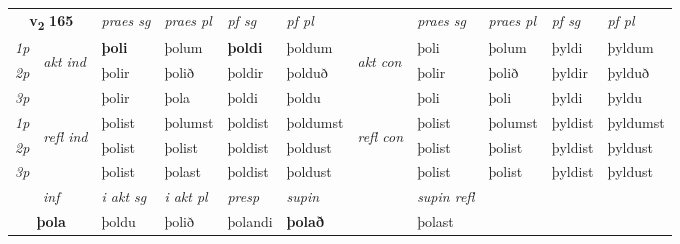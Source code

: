 \noindent
\begin{tabular}{lllllllllll} \toprule
\multicolumn{2}{c}{\textbf{v{\textsubscript{2}}} \Large{\textbf{165}}}  &  \textit{praes sg}  & \textit{praes pl}  &\textit{ pf sg} & \textit{pf pl} &  &  \textit{praes sg}  & \textit{praes pl}  & \textit{pf sg} & \textit{pf pl } \\*
	\cmidrule{3-6} \cmidrule{8-11}
 {\textit{1p}} & \multirow{3}{*}{\begin{turn}{90}\textit{akt ind}\end{turn}} & \textbf{þoli} & þolum & \textbf{þoldi} & þoldum & \multirow{3}{*}{\begin{turn}{90}\textit{akt con}\end{turn}} &þoli & þolum & þyldi & þyldum\\*
 {\textit{2p}} &  &  þolir  & þolið & þoldir & þolduð & & þolir & þolið & þyldir & þylduð \\*
{\textit{3p}} &  & þolir & þola & þoldi & þoldu & & þoli & þoli& þyldi & þyldu \\*
\cmidrule{3-6} \cmidrule{8-11}
 {\textit{1p}} & \multirow{3}{*}{\begin{turn}{90}\textit{refl ind}\end{turn}}  & þolist & þolumst & þoldist & þoldumst & \multirow{3}{*}{\begin{turn}{90}\textit{refl con}\end{turn}}  &þolist & þolumst & þyldist & þyldumst \\*
 {\textit{2p}} &  & þolist & þolist & þoldist & þoldust & &þolist & þolist & þyldist & þyldust \\*
 {\textit{3p}}  & & þolist & þolast & þoldist & þoldust & & þolist & þolist& þyldist & þyldust \\*
\cmidrule{3-6} \cmidrule{8-11}

   \multicolumn{2}{c}{\textit{inf}}  & \textit{i akt sg} & \textit{i akt pl}   & \textit{presp} & \textit{supin} && \textit{supin refl}  \\*
  \multicolumn{2}{c}{\textbf{þola}} & þoldu  & þolið   & þolandi &  \textbf{þolað} && þolast  \\*
\end{tabular}

